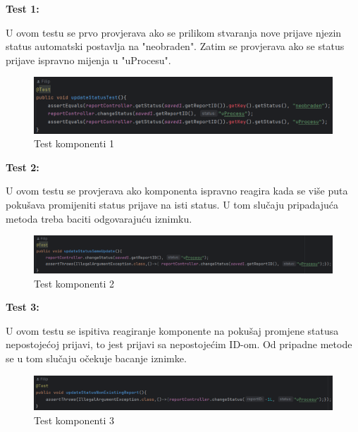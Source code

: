 			\textbf{Test 1:}
			
			U ovom testu se prvo provjerava ako se prilikom stvaranja nove prijave njezin status automatski postavlja na "neobraden". Zatim se provjerava ako se status prijave ispravno mijenja u "uProcesu".
			
			\begin{figure}[H]
				\includegraphics[width=\textwidth]{slike/JUnitTest1.png} %
				\caption{Test komponenti 1}
				\label{fig:JUnitTest1} %
			\end{figure}
			
			\textbf{Test 2:}
			
			U ovom testu se provjerava ako komponenta ispravno reagira kada se više puta pokušava promijeniti status prijave na isti status. U tom slučaju pripadajuća metoda treba baciti odgovarajuću iznimku.
			
			\begin{figure}[H]
				\includegraphics[width=\textwidth]{slike/JUnitTest2.png} %
				\caption{Test komponenti 2}
				\label{fig:JUnitTest2} %
			\end{figure}
			
			\textbf{Test 3:}
			
			U ovom testu se ispitiva reagiranje komponente na pokušaj promjene statusa nepostojećoj prijavi, to jest prijavi sa nepostojećim ID-om. Od pripadne metode se u tom slučaju očekuje bacanje iznimke.
			
			\begin{figure}[H]
				\includegraphics[width=\textwidth]{slike/JUnitTest3.png} %
				\caption{Test komponenti 3}
				\label{fig:JUnitTest3} %
			\end{figure}
				
